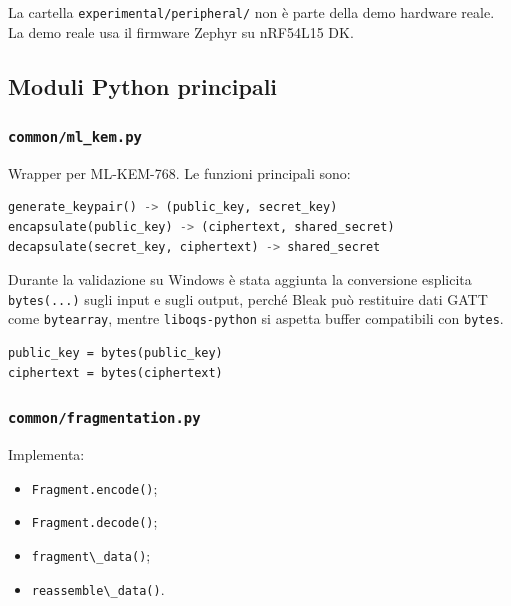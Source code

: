 \documentclass[11pt,a4paper]{article}
\providecommand{\tightlist}{\setlength{\itemsep}{0pt}\setlength{\parskip}{0pt}}
\newcommand{\passthrough}[1]{#1}
\begin{document}
La cartella \passthrough{\lstinline!experimental/peripheral/!} non è
parte della demo hardware reale. La demo reale usa il firmware Zephyr su
nRF54L15 DK.

\subsection{Moduli Python
principali}\label{moduli-python-principali}

\subsubsection{\texorpdfstring{\texttt{common/ml\_kem.py}}{common/ml\_kem.py}}\label{commonml_kem.py}

Wrapper per ML-KEM-768. Le funzioni principali sono:

\begin{lstlisting}[language=Python]
generate_keypair() -> (public_key, secret_key)
encapsulate(public_key) -> (ciphertext, shared_secret)
decapsulate(secret_key, ciphertext) -> shared_secret
\end{lstlisting}

Durante la validazione su Windows è stata aggiunta la conversione
esplicita \passthrough{\lstinline!bytes(...)!} sugli input e sugli
output, perché Bleak può restituire dati GATT come
\passthrough{\lstinline!bytearray!}, mentre
\passthrough{\lstinline!liboqs-python!} si aspetta buffer compatibili
con \passthrough{\lstinline!bytes!}.

\begin{lstlisting}[style=pythonstyle,caption={Normalizzazione dei buffer per liboqs.}]
public_key = bytes(public_key)
ciphertext = bytes(ciphertext)
\end{lstlisting}

\subsubsection{\texorpdfstring{\texttt{common/fragmentation.py}}{common/fragmentation.py}}\label{commonfragmentation.py}

Implementa:

\begin{itemize}
\tightlist
\item
  \passthrough{\lstinline!Fragment.encode()!};
\item
  \passthrough{\lstinline!Fragment.decode()!};
\item
  \passthrough{\lstinline!fragment\_data()!};
\item
  \passthrough{\lstinline!reassemble\_data()!}.
\end{itemize}
\end{document}
